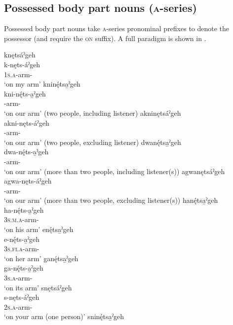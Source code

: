 \subsection{Possessed body part nouns (\textsc{a}-series)} \label{ch:Possessed body part nouns (a series)}
Possessed body part nouns take \textsc{a}-series pronominal prefixes to denote the possessor (and require the  \textsc{on} suffix). A full paradigm is shown in .

\ea\label{ex:possnounppex3}
\ea knętsáˀgeh\\
\gll k-nęts-áˀgeh\\
 \textsc{1s.a}-arm-{\on}\\
\glt `on my arm'
\ex kninę́tsa̱ˀgeh \\
\gll kni-nę́ts-a̱ˀgeh\\
-arm-{\on}\\
\glt ‘on our arm’ (two people, including listener) 
\ex akninętsáˀgeh \\
\gll akni-nęts-áˀgeh\\
-arm-{\on}\\
\glt ‘on our arm’ (two people, excluding listener) 
\ex dwanę́tsa̱ˀgeh \\
\gll dwa-nę́ts-a̱ˀgeh\\
-arm-{\on}\\
\glt ‘on our arm’ (more than two people, including listener(s)) 
\ex agwanętsáˀgeh \\
\gll agwa-nęts-áˀgeh\\
-arm-{\on}\\
\glt ‘on our arm’ (more than two people, excluding listener(s)) 
\ex hanę́tsa̱ˀgeh\\
\gll ha-nę́ts-a̱ˀgeh\\
 \textsc{3s.m.a}-arm-{\on}\\
\glt `on his arm'
\ex enę́tsa̱ˀgeh\\
\gll e-nę́ts-a̱ˀgeh\\
 \textsc{3s.fi.a}-arm-{\on}\\
\glt `on her arm'
\ex ganę́tsa̱ˀgeh\\
\gll ga-nę́ts-a̱ˀgeh\\
 \textsc{3s.a}-arm-{\on}\\
\glt `on its arm'
\ex snętsáˀgeh\\
\gll s-nęts-áˀgeh\\
 \textsc{2s.a}-arm-{\on}\\
\glt `on your arm (one person)'
\ex sninę́tsa̱ˀgeh\\
